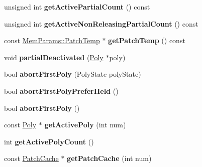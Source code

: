 \begin{DoxyCompactItemize}
\item 
\hypertarget{classMT32Emu_1_1Part_a44a24d2b7a23d6b66b46291197b77b0d}{unsigned int {\bfseries get\-Active\-Partial\-Count} () const }\label{classMT32Emu_1_1Part_a44a24d2b7a23d6b66b46291197b77b0d}

\item 
\hypertarget{classMT32Emu_1_1Part_a5b1b1eba8593a89b204ebed18989c93f}{unsigned int {\bfseries get\-Active\-Non\-Releasing\-Partial\-Count} () const }\label{classMT32Emu_1_1Part_a5b1b1eba8593a89b204ebed18989c93f}

\item 
\hypertarget{classMT32Emu_1_1Part_a4ae4179079ec9076d7fef9d1eb242f8a}{const \hyperlink{structMT32Emu_1_1MemParams_1_1PatchTemp}{Mem\-Params\-::\-Patch\-Temp} $\ast$ {\bfseries get\-Patch\-Temp} () const }\label{classMT32Emu_1_1Part_a4ae4179079ec9076d7fef9d1eb242f8a}

\item 
\hypertarget{classMT32Emu_1_1Part_ae3c840544450fb8d693d9ee9948efb39}{void {\bfseries partial\-Deactivated} (\hyperlink{classMT32Emu_1_1Poly}{Poly} $\ast$poly)}\label{classMT32Emu_1_1Part_ae3c840544450fb8d693d9ee9948efb39}

\item 
\hypertarget{classMT32Emu_1_1Part_a5589abbdcdcba5d514c62c803217fcb4}{bool {\bfseries abort\-First\-Poly} (Poly\-State poly\-State)}\label{classMT32Emu_1_1Part_a5589abbdcdcba5d514c62c803217fcb4}

\item 
\hypertarget{classMT32Emu_1_1Part_a6f70563a2a6a209b448758c23a766513}{bool {\bfseries abort\-First\-Poly\-Prefer\-Held} ()}\label{classMT32Emu_1_1Part_a6f70563a2a6a209b448758c23a766513}

\item 
\hypertarget{classMT32Emu_1_1Part_a126d4aef97c0309bd0ac55768dd4747e}{bool {\bfseries abort\-First\-Poly} ()}\label{classMT32Emu_1_1Part_a126d4aef97c0309bd0ac55768dd4747e}

\item 
\hypertarget{classMT32Emu_1_1Part_a161f3e0000008ff145115d5812b2b891}{const \hyperlink{classMT32Emu_1_1Poly}{Poly} $\ast$ {\bfseries get\-Active\-Poly} (int num)}\label{classMT32Emu_1_1Part_a161f3e0000008ff145115d5812b2b891}

\item 
\hypertarget{classMT32Emu_1_1Part_ab5a4215da2a3834beb619c7c48850bb0}{int {\bfseries get\-Active\-Poly\-Count} ()}\label{classMT32Emu_1_1Part_ab5a4215da2a3834beb619c7c48850bb0}

\item 
\hypertarget{classMT32Emu_1_1Part_a83e32df4e4125b22d970d1f830122d11}{const \hyperlink{structMT32Emu_1_1PatchCache}{Patch\-Cache} $\ast$ {\bfseries get\-Patch\-Cache} (int num)}\label{classMT32Emu_1_1Part_a83e32df4e4125b22d970d1f830122d11}

\end{DoxyCompactItemize}
